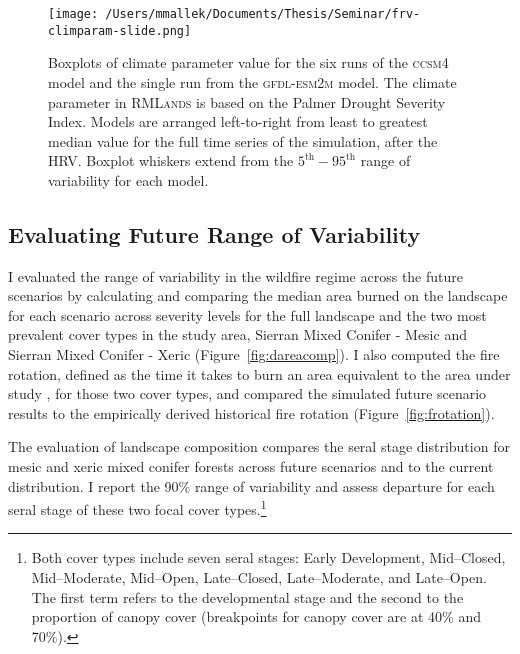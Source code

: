 \begin{figure}[!htbp]
\centering
\texttt{[image: /Users/mmallek/Documents/Thesis/Seminar/frv-climparam-slide.png]}
\caption{Boxplots of climate parameter value for the six runs of the \textsc{ccsm4} model and the single run from the \textsc{gfdl-esm2m} model. The climate parameter in \textsc{RMLands} is based on the Palmer Drought Severity Index. Models are arranged left-to-right from least to greatest median value for the full time series of the simulation, after the HRV. Boxplot whiskers extend from the $5^{\text{th}}-95^{\text{th}}$ range of variability for each model.}
\label{pdsi-boxplots}
\end{figure}


\subsection{Evaluating Future Range of Variability}
\label{sec:evalFRV}
I evaluated the range of variability in the wildfire regime across the future scenarios by calculating and comparing the median area burned on the landscape for each scenario across severity levels for the full landscape and the two most prevalent cover types in the study area, Sierran Mixed Conifer - Mesic and Sierran Mixed Conifer - Xeric (Figure~\ref{fig:dareacomp}). %
I also computed the fire rotation, defined as the time it takes to burn an area equivalent to the area under study \citep{Agee1993}, for those two cover types, and compared the simulated future scenario results to the empirically derived historical fire rotation (Figure~\ref{fig:frotation}). 
%


The evaluation of landscape composition compares the seral stage distribution for mesic and xeric mixed conifer forests across future scenarios and to the current distribution. I report the 90\% range of variability and assess departure for each seral stage of these two focal cover types.\footnote{Both cover types include seven seral stages: Early Development, Mid--Closed, Mid--Moderate, Mid--Open, Late--Closed, Late--Moderate, and Late--Open. The first term refers to the developmental stage and the second to the proportion of canopy cover (breakpoints for canopy cover are at 40\% and 70\%).}


